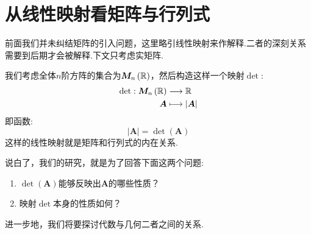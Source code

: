 \section{从线性映射看矩阵与行列式}
前面我们并未纠结矩阵的引入问题，这里略引线性映射来作解释.二者的深刻关系需要到后期才会被解释.下文只考虑实矩阵.

我们考虑全体$n$阶方阵的集合为$
    \bm{M}_n\left(\mathbb{R}
    \right)$，然后构造这样一个映射$\det$:
\begin{align*}
    \det : \bm{M}_n\left(\mathbb{R}
    \right) & \longrightarrow
    \mathbb{R}                    \\
    \bm{A}  & \longmapsto
    \left|\bm{A}\right|
\end{align*}
即函数:
\[
    \left|\bm{A}\right| =  \det\left(\bm{A}\right)
\]
这样的线性映射就是矩阵和行列式的内在关系.

说白了，我们的研究，就是为了回答下面这两个问题:
\begin{enumerate}[label =\textup{(\arabic*)}]
    \item $\det\left(\bm{A}\right)$能够反映出$\bm{A}$的哪些性质？
    \item 映射$\det$本身的性质如何？
\end{enumerate}

进一步地，我们将要探讨代数与几何二者之间的关系.